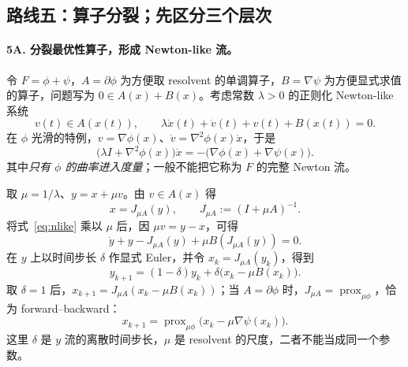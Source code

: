 \documentclass[11pt,a4paper]{ctexart}
\newcommand{\prox}{\operatorname{prox}}
\begin{document}
\subsection{路线五：算子分裂；先区分三个层次}
\paragraph{5A. 分裂最优性算子，形成 Newton-like 流。}
令 $F=\phi+\psi$，$A=\partial\phi$ 为方便取 resolvent 的单调算子，$B=\nabla\psi$ 为方便显式求值的算子，问题写为 $0\in A(x)+B(x)$。考虑常数 $\lambda>0$ 的正则化 Newton-like 系统
\begin{equation}\label{eq:nlike}
v(t)\in A(x(t)),\qquad
\lambda\dot x(t)+\dot v(t)+v(t)+B(x(t))=0.
\end{equation}
在 $\phi$ 光滑的特例，$v=\nabla\phi(x)$、$\dot v=\nabla^2\phi(x)\dot x$，于是
\begin{equation}\label{eq:nlike-smooth}
\bigl(\lambda I+\nabla^2\phi(x)\bigr)\dot x
=-\bigl(\nabla\phi(x)+\nabla\psi(x)\bigr).
\end{equation}
其中\emph{只有 $\phi$ 的曲率进入度量}；一般不能把它称为 $F$ 的完整 Newton 流。

取 $\mu=1/\lambda$、$y=x+\mu v$。由 $v\in A(x)$ 得
\[
x=J_{\mu A}(y),\qquad J_{\mu A}:=(I+\mu A)^{-1}.
\]
将式~\eqref{eq:nlike} 乘以 $\mu$ 后，因 $\mu v=y-x$，可得
\begin{equation}\label{eq:yflow}
\dot y+y-J_{\mu A}(y)+\mu B(J_{\mu A}(y))=0.
\end{equation}
在 $y$ 上以时间步长 $\delta$ 作显式 Euler，并令 $x_k=J_{\mu A}(y_k)$，得到
\begin{equation}\label{eq:y-euler}
y_{k+1}=(1-\delta)y_k+\delta\bigl(x_k-\mu B(x_k)\bigr).
\end{equation}
取 $\delta=1$ 后，$x_{k+1}=J_{\mu A}(x_k-\mu B(x_k))$；当 $A=\partial\phi$ 时，$J_{\mu A}=\prox_{\mu\phi}$，恰为 forward--backward：
\begin{equation}\label{eq:fb}
x_{k+1}=\prox_{\mu\phi}\bigl(x_k-\mu\nabla\psi(x_k)\bigr).
\end{equation}
这里 $\delta$ 是 $y$ 流的离散时间步长，$\mu$ 是 resolvent 的尺度，二者不能当成同一个参数。
\end{document}
